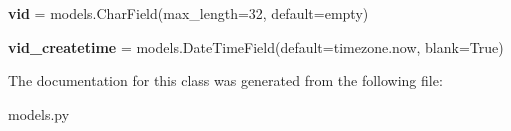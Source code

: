 \begin{DoxyCompactItemize}
\item 
\mbox{\label{classbackend_1_1models_1_1_customer_service_afed4ee03d4fddfda167fd0970f369488}} 
{\bfseries vid} = models.\+Char\+Field(max\+\_\+length=32, default=\textquotesingle{}empty\textquotesingle{})
\item 
\mbox{\label{classbackend_1_1models_1_1_customer_service_ad6e0221ddd7b485e04f156e3eb935c31}} 
{\bfseries vid\+\_\+createtime} = models.\+Date\+Time\+Field(default=timezone.\+now, blank=True)
\end{DoxyCompactItemize}


The documentation for this class was generated from the following file\+:\begin{DoxyCompactItemize}
\item 
models.\+py\end{DoxyCompactItemize}
